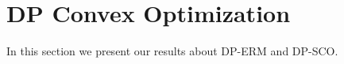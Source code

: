 \section{DP Convex Optimization}
In this section we present our results about DP-ERM and DP-SCO.









